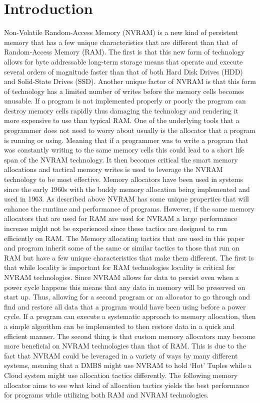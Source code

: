 \documentclass[conference]{IEEEtran}
\begin{document}
\section{Introduction}
Non-Volatile Random-Access Memory (NVRAM) is a new kind of persistent memory that has a few unique characteristics that are different than that of Random-Access Memory (RAM).  The first is that this new form of technology allows for byte addressable long-term storage means that operate and execute several orders of magnitude faster than that of both Hard Disk Drives (HDD) and Solid-State Drives (SSD). Another unique factor of NVRAM is that this form of technology has a limited number of writes before the memory cells becomes unusable. If a program is not implemented properly or poorly the program can destroy memory cells rapidly thus damaging the technology and rendering it more expensive to use than typical RAM. One of the underlying tools that a programmer does not need to worry about usually is the allocator that a program is running or using.  Meaning that if a programmer was to write a program that was constantly writing to the same memory cells this could lead to a short life span of the NVRAM technology. It then becomes critical the smart memory allocations and tactical memory writes is used to leverage the NVRAM technology to be most effective. 
Memory allocators have been used in systems since the early 1960s with the buddy memory allocation being implemented and used in 1963. As described above NVRAM has some unique properties that will enhance the runtime and performance of programs. However, if the same memory allocators that are used for RAM are used for NVRAM a large performance increase might not be experienced since these tactics are designed to run efficiently on RAM. The Memory allocating tactics that are used in this paper and program inherit some of the same or similar tactics to those that run on RAM but have a few unique characteristics that make them different. The first is that while locality is important for RAM technologies locality is critical for NVRAM technologies. Since NVRAM allows for data to persist even when a power cycle happens this means that any data in memory will be preserved on start up. Thus, allowing for a second program or an allocator to go through and find and restore all data that a program would have been using before a power cycle.  If a program can execute a systematic approach to memory allocation, then a simple algorithm can be implemented to then restore data in a quick and efficient manner. The second thing is that custom memory allocators may become more beneficial on NVRAM technologies than that of RAM. This is due to the fact that NVRAM could be leveraged in a variety of ways by many different systems, meaning that a DMBS might use NVRAM to hold ‘Hot’ Tuples while a Cloud system might use allocation tactics differently.  The following memory allocator aims to see what kind of allocation tactics yields the best performance for programs while utilizing both RAM and NVRAM technologies. 
\end{document}
